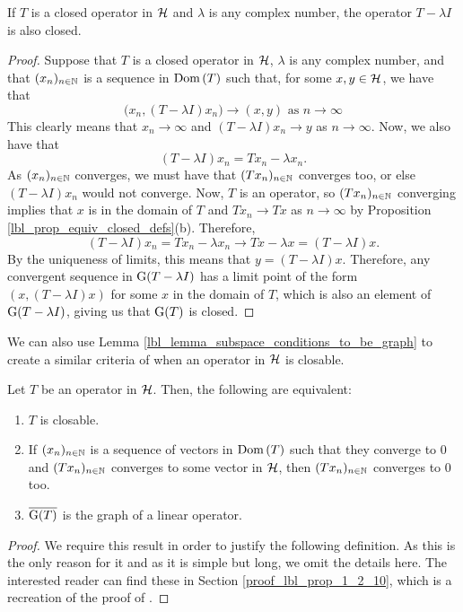\begin{corollary}\label{lbl_closed_means_resolvent_function_closed}
  If $T$ is a closed operator in $\mathcal{H}$ and $\lambda$ is any complex number, the operator $T - \lambda I$ is also closed.
\end{corollary}
\begin{proof}
  Suppose that $T$ is a closed operator in $\mathcal{H}$, $\lambda$ is any complex number, and that $(x_n)_{n \in \mathbb{N}}$ is a sequence in $\operatorname{Dom}\left(T\right)$ such that, for some $x, y \in \mathcal{H}$, we have that
  \begin{equation*}
    \big(x_n, (T - \lambda I)x_n \big) \to (x, y) \,\,\text{as $n \to \infty$}
  \end{equation*}
  This clearly means that $x_n \to \infty$ and $(T - \lambda I)x_n \to y$ as $n \to \infty$. Now, we also have that
  \begin{equation*}
    (T - \lambda I)x_n = Tx_n - \lambda x_n.
  \end{equation*}
  As $(x_n)_{n \in \mathbb{N}}$ converges, we must have that $(Tx_n)_{n \in \mathbb{N}}$ converges too, or else $(T - \lambda I)x_n$ would not converge. Now, $T$ is an operator, so $(Tx_n)_{n \in \mathbb{N}}$ converging implies that $x$ is in the domain of $T$ and $Tx_n \to Tx$ as $n \to \infty$ by Proposition \eqref{lbl_prop_equiv_closed_defs}(b). Therefore,
  \begin{equation*}
    (T - \lambda I)x_n = Tx_n - \lambda x_n
    \to
    Tx - \lambda x
    =
    (T - \lambda I)x.
  \end{equation*}
  By the uniqueness of limits, this means that $y = (T - \lambda I)x$. Therefore, any convergent sequence in $\operatorname{G}(T - \lambda I)$ has a limit point of the form $(x, (T - \lambda I)x)$ for some $x$ in the domain of $T$, which is also an element of $\operatorname{G}(T - \lambda I)$, giving us that $\operatorname{G}(T)$ is closed.
\end{proof}

We can also use Lemma \eqref{lbl_lemma_subspace_conditions_to_be_graph} to create a similar criteria of when an operator in $\mathcal{H}$ is closable.

\begin{proposition}\label{lbl_prop_1_2_10}
  Let $T$ be an operator in $\mathcal{H}$. Then, the following are equivalent:
  \begin{enumerate}[label = (\alph*)]
    \item $T$ is closable.
    \item If $(x_n)_{n \in \mathbb{N}}$ is a sequence of vectors in $\operatorname{Dom}\left(T\right)$ such that they converge to 0 and $(Tx_n)_{n \in \mathbb{N}}$ converges to some vector in $\mathcal{H}$, then $(Tx_n)_{n \in  \mathbb{N}}$ converges to 0 too.
    \item $\overline{\operatorname{G}(T)}$ is the graph of a linear operator.
  \end{enumerate}
\end{proposition}
\begin{proof}
    We require this result in order to justify the following definition. As this is the only reason for it and as it is simple but long, we omit the details here. The interested reader can find these in Section \eqref{proof_lbl_prop_1_2_10}, which is a recreation of the proof of {\cite[Proposition 1.5]{konrad}}.
\end{proof}

